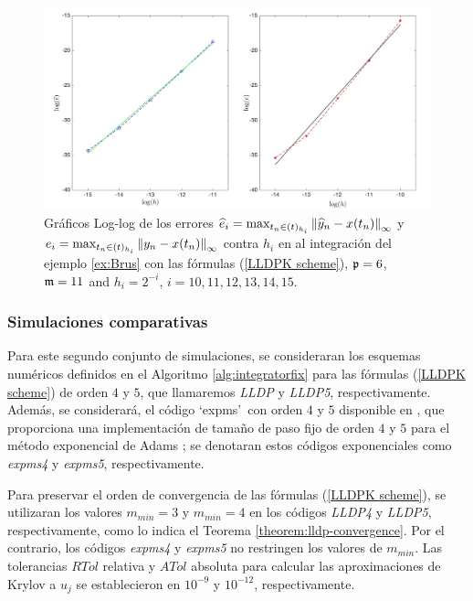\begin{figure}[h]
	\begin{center}
		\includegraphics[scale=0.45]{Graphics/lldp/LLDP-plots.jpg}
		\caption{ Gráficos Log-log de los errores $\widehat{e}_i=\max_{t_n\in(t)_{h_i}}\left\lVert \widehat{y}_n-x(t_n) \right\rVert_\infty$ y $e_i=\max_{t_n\in(t)_{h_i}}\left\lVert y_n-x(t_n) \right\rVert_\infty$ contra $h_i$ en al integración del ejemplo \ref{ex:Brus} con las fórmulas (\ref{LLDPK scheme}), $\mathfrak{p}=6$, $\mathfrak{m}=11$ and $h_i=2^{-i}$, $i=10,11,12,13,14,15$.}
		\label{fig:num-exp-lldp-fix-step:Fig4}
	\end{center}
\end{figure}

\subsubsection{Simulaciones comparativas}
Para este segundo conjunto de simulaciones, se consideraran los esquemas numéricos definidos en el Algoritmo \ref{alg:integratorfix} para las fórmulas (\ref{LLDPK scheme}) de orden $4$ y $5$, que llamaremos \emph{LLDP } y \emph{LLDP5}, respectivamente. Además, se considerará, el código \textquoteleft expms\textquoteright~con orden $4$ y $5$ disponible en \cite{jansing2011expode}, que proporciona una implementación de tamaño de paso fijo de orden $4$ y $5$ para el método exponencial de Adams \cite{hochbruck2011exponential}; se denotaran estos códigos exponenciales como \emph{expms4} y \emph{expms5}, respectivamente.

Para preservar el orden de convergencia de las fórmulas (\ref{LLDPK scheme}), se utilizaran los valores $m_{min}=3$ y $m_{min}=4$ en los códigos \emph{LLDP4} y \emph{ LLDP5}, respectivamente, como lo indica el Teorema \ref{theorem:lldp-convergence}. Por el contrario, los códigos \emph{expms4} y \emph{expms5} no restringen los valores de $m_{min}$. Las tolerancias $RTol$ relativa y $ATol$ absoluta para calcular las aproximaciones de Krylov a $u_j$ se establecieron en $10^{-9}$ y $10^{-12}$, respectivamente.

